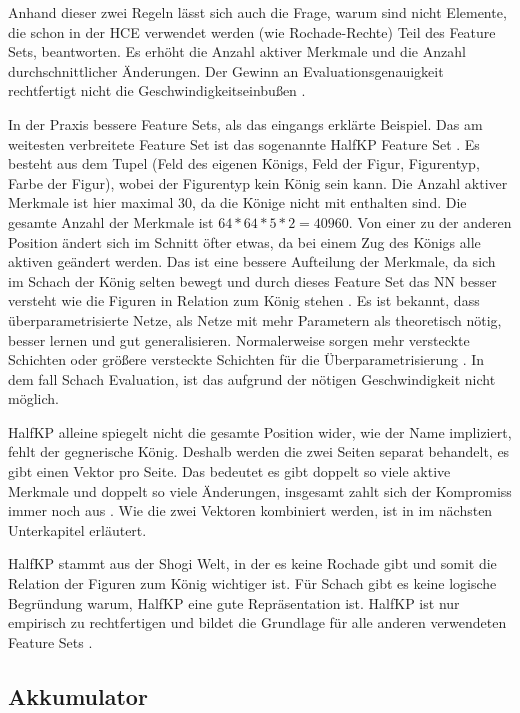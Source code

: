 Anhand dieser zwei Regeln lässt sich auch die Frage, warum sind nicht Elemente, die schon in der \ac{HCE} verwendet werden (wie \zb{} Rochade-Rechte) Teil des Feature Sets, beantworten. Es erhöht die Anzahl aktiver Merkmale und die Anzahl durchschnittlicher Änderungen. Der Gewinn an Evaluationsgenauigkeit rechtfertigt nicht die Geschwindigkeitseinbußen \cite{StockfishNNUE}.

In der Praxis bessere Feature Sets, als das eingangs erklärte Beispiel. Das am weitesten verbreitete Feature Set ist das sogenannte HalfKP Feature Set \cite{YNasu2018,StockfishNNUE}. Es besteht aus dem Tupel (Feld des eigenen Königs, Feld der Figur, Figurentyp, Farbe der Figur), wobei der Figurentyp kein König sein kann. Die Anzahl aktiver Merkmale ist hier maximal 30, da die Könige nicht mit enthalten sind. Die gesamte Anzahl der Merkmale ist $64*64*5*2=40960$. Von einer zu der anderen Position ändert sich im Schnitt öfter etwas, da bei einem Zug des Königs alle aktiven geändert werden. Das ist eine bessere Aufteilung der Merkmale, da sich im Schach der König selten bewegt und durch dieses Feature Set das \ac{NN} besser versteht wie die Figuren in Relation zum König stehen \cite{StockfishNNUE}. Es ist bekannt, dass überparametrisierte Netze, als Netze mit mehr Parametern als theoretisch nötig, besser lernen und gut generalisieren. Normalerweise sorgen mehr versteckte Schichten oder größere versteckte Schichten für die Überparametrisierung \cite{Du2018, allen2019learning}. In dem fall Schach Evaluation, ist das aufgrund der nötigen Geschwindigkeit nicht möglich.

HalfKP alleine spiegelt nicht die gesamte Position wider, wie der Name impliziert, fehlt der gegnerische König. Deshalb werden die zwei Seiten separat behandelt, es gibt einen Vektor pro Seite. Das bedeutet es gibt doppelt so viele aktive Merkmale und doppelt so viele Änderungen, insgesamt zahlt sich der Kompromiss immer noch aus \cite{StockfishNNUE}. Wie die zwei Vektoren kombiniert werden, ist in im nächsten Unterkapitel erläutert.

HalfKP stammt aus der Shogi Welt, in der es keine Rochade gibt und somit die Relation der Figuren zum König wichtiger ist. Für Schach gibt es keine logische Begründung warum, HalfKP eine gute Repräsentation ist. HalfKP ist nur empirisch zu rechtfertigen und bildet die Grundlage für alle anderen verwendeten Feature Sets \cite{StockfishNNUE}.

\subsection{Akkumulator}

